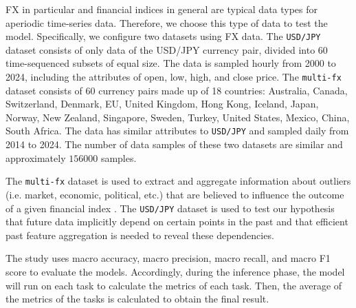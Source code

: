\documentclass[aps,prb,groupedaddress,twocolumn,showpacs,dvipdfmx,superscriptaddress,pdftex]{revtex4-2}
\begin{document}
FX in particular and financial indices in general are typical data types for aperiodic time-series data. Therefore, we choose this type of data to test the model. Specifically, we configure two datasets using FX data. The \verb|USD/JPY| dataset consists of only data of the USD/JPY currency pair, divided into 60 time-sequenced subsets of equal size. The data is sampled hourly from 2000 to 2024, including the attributes of open, low, high, and close price. The \verb|multi-fx| dataset consists of 60 currency pairs made up of 18 countries: Australia, Canada, Switzerland, Denmark, EU, United Kingdom, Hong Kong, Iceland, Japan, Norway, New Zealand, Singapore, Sweden, Turkey, United States, Mexico, China, South Africa. The data has similar attributes to \verb|USD/JPY| and sampled daily from 2014 to 2024. The number of data samples of these two datasets are similar and approximately $156000$ samples.

\vspace{2mm}


The \verb|multi-fx| dataset is used to extract and aggregate information about outliers (i.e. market, economic, political, etc.) that are believed to influence the outcome of a given financial index \citep{overreactioncontrarian,fama1970efficient,mech1993portfolio}. The \verb|USD/JPY| dataset is used to test our hypothesis that future data implicitly depend on certain points in the past and that efficient past feature aggregation is needed to reveal these dependencies.

\vspace{2mm}


The study uses macro accuracy, macro precision, macro recall, and macro F1 score to evaluate the models. Accordingly, during the inference phase, the model will run on each task to calculate the metrics of each task. Then, the average of the metrics of the tasks is calculated to obtain the final result.
\end{document}
